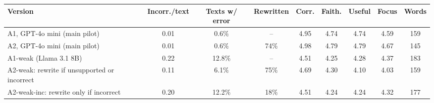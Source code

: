 \begin{tabular}{lcccccccc}
\toprule
Version & Incorr./text & Texts w/ error & Rewritten & Corr. & Faith. & Useful & Focus & Words \\
\midrule
A1, GPT-4o mini (main pilot) & 0.01 & 0.6\% & -- & 4.95 & 4.74 & 4.74 & 4.59 & 159 \\
A2, GPT-4o mini (main pilot) & 0.01 & 0.6\% & 74\% & 4.98 & 4.79 & 4.79 & 4.67 & 145 \\
\midrule
A1-weak (Llama 3.1 8B) & 0.22 & 12.8\% & -- & 4.51 & 4.25 & 4.28 & 4.37 & 183 \\
A2-weak: rewrite if unsupported or incorrect & 0.11 & 6.1\% & 75\% & 4.69 & 4.30 & 4.10 & 4.03 & 159 \\
A2-weak-inc: rewrite only if incorrect & 0.20 & 12.2\% & 18\% & 4.51 & 4.24 & 4.24 & 4.32 & 177 \\
\bottomrule
\end{tabular}